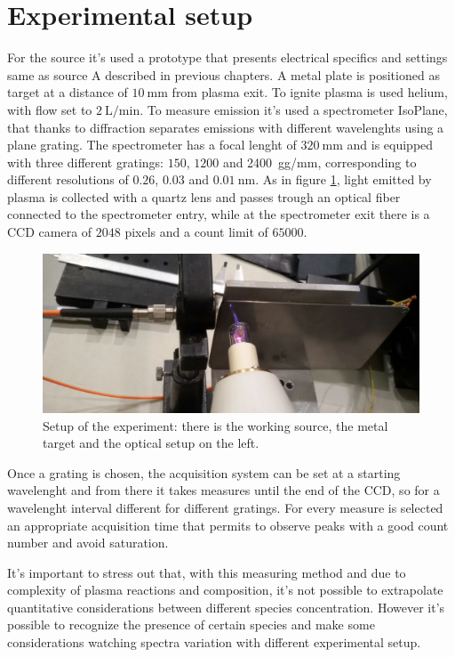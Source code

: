 \section{Experimental setup}
For the source it's used a prototype that presents electrical specifics and settings same as source A described in previous chapters. A metal plate is positioned as target at a distance of $\SI{10}{\milli\meter}$ from plasma exit. To ignite plasma is used helium, with flow set to $\SI{2}{\liter/\minute}$.
To measure emission it's used a spectrometer IsoPlane, that thanks to diffraction separates emissions with different wavelenghts using a plane grating. The spectrometer has a focal lenght of $\SI{320}{\milli\meter}$ and is equipped with three different gratings: $\num{150}$, $\num{1200}$ and \SI{2400}{gg/\milli\meter}, corresponding to different resolutions of $\num{0.26}$, $\num{0.03}$ and $\SI{0.01}{\nano\meter}$.
As in figure \ref{fig:app}, light emitted by plasma is collected with a quartz lens %
and passes trough an optical fiber %
connected to the spectrometer entry, while at the spectrometer exit there is a CCD camera of $2048$ pixels and a count limit of $\num{65000}$.
\begin{figure}
\centering
\includegraphics[width=.6\textwidth]{Images/Spectroscopy/apparato.jpg}
\caption{Setup of the experiment: there is the working source, the metal target and the optical setup on the left.}
\label{fig:app}
\end{figure}

Once a grating is chosen, the acquisition system can be set at a starting wavelenght and from there it takes measures until the end of the CCD, so for a wavelenght interval different for different gratings.
For every measure is selected an appropriate acquisition time that permits to observe peaks with a good count number and avoid saturation.

It's important to stress out that, with this measuring method and due to complexity of plasma reactions and composition, it's not possible to extrapolate quantitative considerations between different species concentration. However it's possible to recognize the presence of certain species and make some considerations watching spectra variation with different experimental setup.

